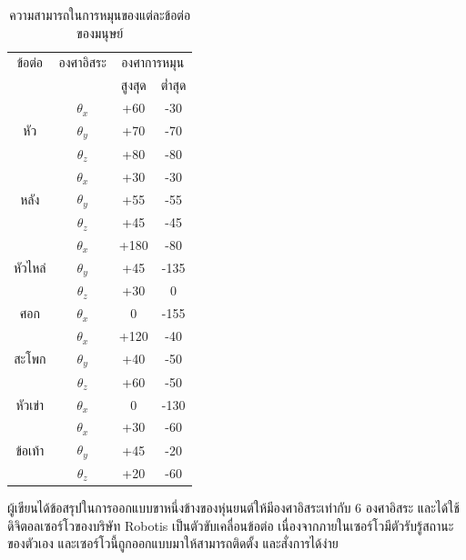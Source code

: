 \begin{table}[!ht]
	\centering
	\begin{tabular}{|c|c|c|c|}
		\hline
		{ข้อต่อ}&{องศาอิสระ}&\multicolumn{2}{c|}{องศาการหมุน}\\
		\cline{3-4}
		{}                                     & {}         & {สูงสุด} & {ต่ำสุด} \\
		\hline
		\multirow{3}{*}{หัว}             & $\theta_x$ & +60                  & -30                  \\
		\cline{3-4}
		                                       & $\theta_y$ & +70                  & -70                  \\
		\cline{3-4}
		                                       & $\theta_z$ & +80                  & -80                  \\
		\hline
		\multirow{3}{*}{หลัง}          & $\theta_x$ & +30                  & -30                  \\
		\cline{3-4}
		                                       & $\theta_y$ & +55                  & -55                  \\
		\cline{3-4}
		                                       & $\theta_z$ & +45                  & -45                  \\
		\hline
		\multirow{3}{*}{หัวไหล่} & $\theta_x$ & +180                 & -80                  \\
		\cline{3-4}
		                                       & $\theta_y$ & +45                  & -135                 \\
		\cline{3-4}
		                                       & $\theta_z$ & +30                  & 0                    \\
		\hline
		{ศอก}                            & $\theta_x$ & 0                    & -155                 \\
		\hline
		\multirow{3}{*}{สะโพก}       & $\theta_x$ & +120                 & -40                  \\
		\cline{3-4}
		                                       & $\theta_y$ & +40                  & -50                  \\
		\cline{3-4}
		                                       & $\theta_z$ & +60                  & -50                  \\
		\hline
        {หัวเข่า}                & $\theta_x$ & 0                    & -130                 \\
        \hline
		\multirow{3}{*}{ข้อเท้า} & $\theta_x$ & +30                  & -60                  \\
		\cline{3-4}
		                                       & $\theta_y$ & +45                  & -20                  \\
		\cline{3-4}
		                                       & $\theta_z$ & +20                  & -60                  \\
		\hline
	\end{tabular}
	\caption{ความสามารถในการหมุนของแต่ละข้อต่อของมนุษย์}
	\label{tab:human_joint_limit}
\end{table}

ผู้เขียนได้ข้อสรุปในการออกแบบขาหนึ่งข้างของหุ่นยนต์ให้มีองศาอิสระเท่ากับ 6 องศาอิสระ และได้ใช้ดิจิตอลเซอร์โวของบริษัท Robotis เป็นตัวขับเคลื่อนข้อต่อ
เนื่องจากภายในเซอร์โวมีตัวรับรู้สถานะของตัวเอง และเซอร์โวนี้ถูกออกแบบมาให้สามารถติดตั้ง และสั่งการได้ง่าย

